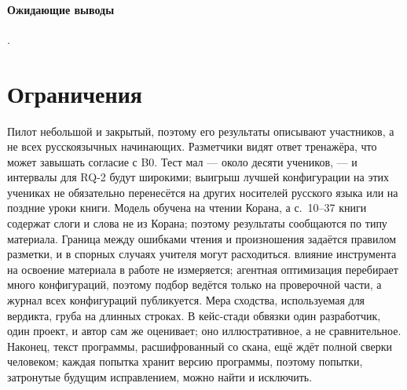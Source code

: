 \paragraph{Ожидающие выводы} .

\section{Ограничения}\label{sec:eval-limits}

Пилот небольшой и закрытый, поэтому его результаты описывают участников, а не всех русскоязычных
начинающих. Разметчики видят ответ тренажёра, что может завышать согласие с B0. Тест мал --- около десяти учеников, --- и интервалы для RQ-2 будут широкими;
выигрыш лучшей конфигурации на этих учениках не обязательно перенесётся на других носителей русского языка или на
поздние уроки книги. Модель обучена на чтении
Корана, а с.~10--37 книги содержат слоги и слова не из Корана; поэтому результаты сообщаются по типу
материала. Граница между ошибками чтения и произношения задаётся правилом разметки, и в спорных случаях учителя
могут расходиться. влияние инструмента на освоение материала в работе не измеряется; агентная оптимизация перебирает много конфигураций, поэтому подбор ведётся только на проверочной части, а журнал всех конфигураций публикуется. Мера сходства, используемая для вердикта, груба на длинных строках. В кейс-стади обвязки один
разработчик, один проект, и автор сам же оценивает; оно иллюстративное, а не сравнительное. Наконец, текст
программы, расшифрованный со скана, ещё ждёт полной сверки человеком; каждая попытка хранит версию
программы, поэтому попытки, затронутые будущим исправлением, можно найти и исключить.
